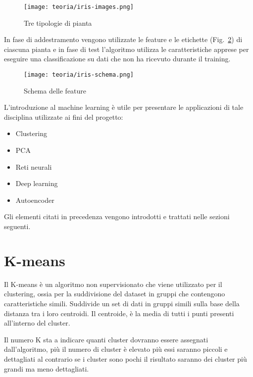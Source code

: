 \begin{figure}[!h] 
    \centering 
    \texttt{[image: teoria/iris-images.png]} 
    \caption{Tre tipologie di pianta}
    \label{fig:iris-images}
  \end{figure}

In fase di addestramento vengono utilizzate le feature e le etichette (Fig.~\ref{fig:iris-schema}) di ciascuna pianta e in fase di test l'algoritmo utilizza le caratteristiche apprese per eseguire una classificazione su dati che non ha ricevuto durante il training.

\begin{figure}[!h] 
    \centering 
    \texttt{[image: teoria/iris-schema.png]} 
    \caption{Schema delle feature}
    \label{fig:iris-schema}
  \end{figure}

L'introduzione al machine learning è utile per presentare le applicazioni di tale disciplina utilizzate ai fini del progetto:
\begin{itemize}
    \item Clustering
    \item PCA
    \item Reti neurali
    \item Deep learning
    \item Autoencoder
\end{itemize}
Gli elementi citati in precedenza vengono introdotti e trattati nelle sezioni seguenti.

\section{K-means}
Il K-means è un algoritmo non supervisionato che viene utilizzato per il clustering, ossia per la suddivisione del dataset in gruppi che contengono caratteristiche simili.
Suddivide un set di dati in gruppi simili sulla base della distanza tra i loro centroidi. 
Il centroide, è la media di tutti i punti presenti all'interno del cluster.

Il numero K sta a indicare quanti cluster dovranno essere assegnati dall'algoritmo, più il numero di cluster è elevato più essi saranno piccoli e dettagliati al contrario se i cluster sono pochi il risultato saranno dei cluster più grandi ma meno dettagliati.

